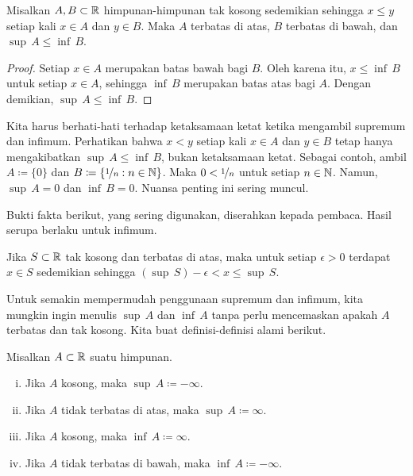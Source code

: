 \begin{prop} \label{infsupineq:prop}
Misalkan $A, B \subset {\mathbb{R}}$ himpunan-himpunan tak kosong sedemikian sehingga $x \leq y$ setiap kali $x \in A$ dan
$y \in B$.  Maka $A$ terbatas di atas, $B$ terbatas di bawah, dan $\sup\, A \leq \inf\, B$.
\end{prop}

\begin{proof}
Setiap $x \in A$ merupakan batas bawah bagi $B$.
Oleh karena itu, $x \leq \inf\, B$ untuk setiap $x \in A$,
sehingga $\inf\, B$ merupakan batas atas bagi $A$.
Dengan demikian, $\sup\, A \leq \inf\, B$.
\end{proof}

Kita harus berhati-hati terhadap ketaksamaan ketat ketika mengambil supremum dan infimum.
Perhatikan bahwa $x < y$ setiap kali $x \in A$ dan
$y \in B$ tetap hanya mengakibatkan $\sup\, A \leq \inf\, B$, bukan ketaksamaan
ketat.
Sebagai contoh, ambil $A \coloneqq \{ 0 \}$ dan $B \coloneqq \{ \nicefrac{1}{n}
: n \in {\mathbb{N}} \}$.
Maka $0 < \nicefrac{1}{n}$
untuk setiap $n \in {\mathbb{N}}$.  Namun, $\sup\, A = 0$ dan $\inf\, B = 0$.
Nuansa penting ini sering muncul.

\medskip
\pagebreak[1]

Bukti fakta berikut, yang
sering digunakan, diserahkan kepada pembaca.
Hasil serupa berlaku untuk infimum.

\begin{prop} \label{prop:existsxepsfromsup}
Jika $S \subset {\mathbb{R}}$ tak kosong dan terbatas di atas,
maka untuk setiap $\epsilon > 0$ terdapat $x \in S$ sedemikian
sehingga $(\sup\, S) - \epsilon < x \leq \sup\, S$.
\end{prop}


Untuk semakin mempermudah penggunaan supremum dan infimum, kita mungkin ingin
menulis $\sup\, A$ dan $\inf\, A$ tanpa perlu mencemaskan apakah $A$
terbatas dan tak kosong.  Kita buat definisi-definisi alami berikut.

\begin{defn}
Misalkan $A \subset {\mathbb{R}}$ suatu himpunan.
\begin{enumerate}[(i)]
\item Jika $A$ kosong, maka $\sup\, A \coloneqq -\infty$.
\item Jika $A$ tidak terbatas di atas, maka $\sup\, A \coloneqq \infty$.
\item Jika $A$ kosong, maka $\inf\, A \coloneqq \infty$.
\item Jika $A$ tidak terbatas di bawah, maka $\inf\, A \coloneqq -\infty$.
\end{enumerate}
\end{defn}

